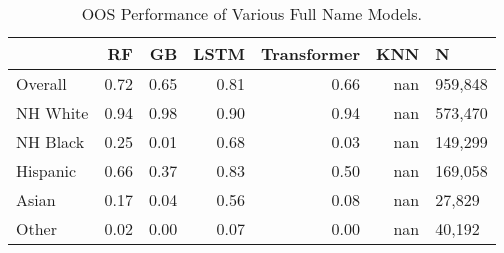 \begin{table}
\centering
\caption{OOS Performance of Various Full Name Models.}
\label{table:oos_full_name_perf}
\begin{tabular}{lrrrrrl}
\toprule
 & RF & GB & LSTM & Transformer & KNN & N \\
\midrule
Overall & 0.72 & 0.65 & 0.81 & 0.66 & nan & 959,848 \\
NH White & 0.94 & 0.98 & 0.90 & 0.94 & nan & 573,470 \\
NH Black & 0.25 & 0.01 & 0.68 & 0.03 & nan & 149,299 \\
Hispanic & 0.66 & 0.37 & 0.83 & 0.50 & nan & 169,058 \\
Asian & 0.17 & 0.04 & 0.56 & 0.08 & nan & 27,829 \\
Other & 0.02 & 0.00 & 0.07 & 0.00 & nan & 40,192 \\
\bottomrule
\end{tabular}
\end{table}
